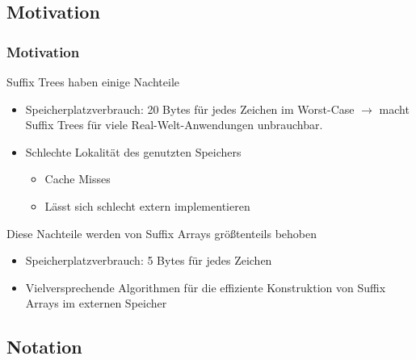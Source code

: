 \documentclass{beamer}
\begin{document}
\frame{\sectionpage}

\subsection{Motivation}

\begin{frame}[fragile]
\frametitle{Motivation}
Suffix Trees haben einige Nachteile
\begin{itemize}
    \item Speicherplatzverbrauch: 20 Bytes für jedes Zeichen im Worst-Case $\rightarrow$ macht Suffix Trees für viele Real-Welt-Anwendungen unbrauchbar.
    \item Schlechte Lokalität des genutzten Speichers
        \begin{itemize}
            \item Cache Misses
            \item Lässt sich schlecht extern implementieren
        \end{itemize}
\end{itemize}
\vspace{5mm}
Diese Nachteile werden von Suffix Arrays größtenteils behoben
\begin{itemize}
    \item Speicherplatzverbrauch: 5 Bytes für jedes Zeichen
    \item Vielversprechende Algorithmen für die effiziente Konstruktion von Suffix Arrays im externen Speicher
\end{itemize}
\end{frame}

\subsection{Notation}
\end{document}
